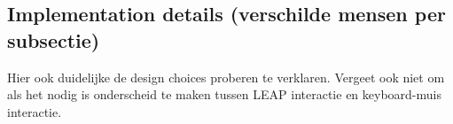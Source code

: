 \subsection{Implementation details (verschilde mensen per subsectie)}
Hier ook duidelijke de design choices proberen te verklaren. Vergeet ook niet om als het nodig is onderscheid te maken tussen LEAP interactie en keyboard-muis interactie.




